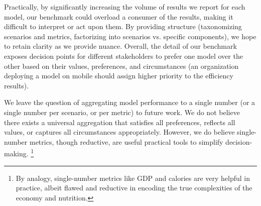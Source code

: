 Practically, by significantly increasing the volume of results we report for each model, our benchmark could overload a consumer of the results, making it difficult to interpret or act upon them.
By providing structure (\eg taxonomizing scenarios and metrics, factorizing into \core scenarios vs. specific components), we hope to retain clarity as we provide nuance.
Overall, the detail of our benchmark exposes decision points for different stakeholders to prefer one model over the other based on their values, preferences, and circumstances (\eg an organization deploying a model on mobile should assign higher priority to the efficiency results). 

We leave the question of aggregating model performance to a single number (or a single number per scenario, or per metric) to future work.
We do not believe there exists a universal aggregation that satisfies all preferences, reflects all values, or captures all circumstances appropriately.
However, we do believe single-number metrics, though reductive, are useful practical tools to simplify decision-making.
\footnote{By analogy, single-number metrics like GDP and calories are very helpful in practice, albeit flawed and reductive in encoding the true complexities of the economy and nutrition.}